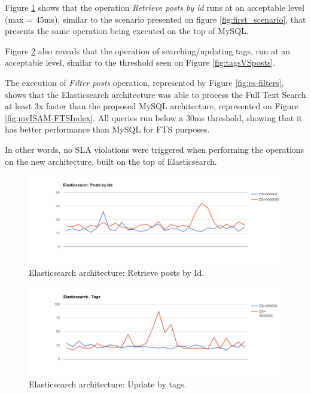 Figure \ref{fig:retrieve-posts by-id-es} shows that the operation \textit{Retrieve posts by id} runs at an acceptable level (max = 45ms), similar to the scenario presented on figure \ref{fig:first_scenario}, that presents the same operation being executed on the top of MySQL.

Figure \ref{fig:search-tags} also reveals that the operation of searching/updating tags, run at an acceptable level, similar to the threshold seen on Figure \ref{fig:tagsVSposts}.

The execution of \textit{Filter posts} operation, represented by Figure \ref{fig:es-filters}, shows that the Elasticsearch architecture was able to process the Full Text Search at least 3x faster than the proposed MySQL architecture, represented on Figure \ref{fig:myISAM-FTSIndex}. All queries run below a 30ms threshold, showing that it has better performance than MySQL for FTS purposes.

In other words, no SLA violations were triggered when performing the operations on the new architecture, built on the top of Elasticsearch.

\begin{figure}[ht!]
	\centering
	\includegraphics[width=150mm]{Imagens/es-posts-by-ids.png}
	\caption{Elasticsearch architecture: Retrieve posts by Id. \label{fig:retrieve-posts by-id-es}}
\end{figure}

\begin{figure}[ht!]
	\centering
	\includegraphics[width=150mm]{Imagens/es-search-tags.png}
	\caption{Elasticsearch architecture: Update by tags. \label{fig:search-tags}}
\end{figure}

